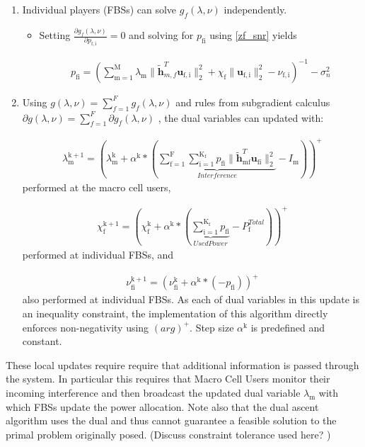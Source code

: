 \documentclass[12pt,a4paper]{report}
\begin{document}
\begin{enumerate}
\item 
Individual players (FBSs) can solve $ g_f(\lambda,\nu) $ independently.
\begin{itemize}
\item Setting $\frac{\partial g_f(\lambda,\nu)}{\partial p_{\mathrm{f,i}}} = 0$ 
and solving for $p_{\mathrm{fi}}$ using \eqref{zf_snr} yields

\begin{gather}
p_{\mathrm{fi}} = (\sum_{\mathrm{m=1}}^{\mathrm{M}}\lambda_{\mathrm{m}}\|\mathbf{\tilde{h}}_{m,f}^T \mathbf{u}_{\mathrm{f,i}}\|^2_2
+\chi_{\text{f}} \|\mathbf{u}_{\mathrm{f,i}}\|^2_2
-\nu_{\mathrm{f,i}}
 )^{-1}
  - \sigma^2_n
\end{gather}

\end{itemize}
\item 
Using $g(\lambda,\nu) = \sum_{f=1}^{F}g_f(\lambda,\nu)$ and rules from subgradient calculus 
$\partial g(\lambda,\nu) = \sum_{f=1}^{F} \partial g_f(\lambda,\nu)$ 
, the dual variables can updated with:

\begin{gather}
\lambda_{\mathrm{m}}^{\mathrm{k+1}} = (
\lambda_{\mathrm{m}}^{\mathrm{k}}
+
\alpha^{\mathrm{k}}*
(
\underbrace{
\sum _{\mathrm{f=1}}^{\mathrm{F}}
\sum _{\mathrm{i=1}}^{\mathrm{K_{\mathrm{f}}}}
p_{\mathrm{fi}}
\|\mathbf{\tilde{h}}_{\mathrm{mf}}^T \mathbf{u_{\mathrm{fi}}}\|^2_2}_{Interference}
- I_{\mathrm{m}}
))^+
\end{gather}
performed at the macro cell users,

\begin{gather}
\chi_{\mathrm{f}}^{\mathrm{k+1}} = (
\chi_{\mathrm{f}}^{\mathrm{k}}
+
\alpha^{\mathrm{k}}*
(\underbrace{\sum_{\mathrm{i=1}}^{\mathrm{K_{\mathrm{f}}}} p_{\mathrm{fi}}}_{Used Power} - P_{\mathrm{f}}^{Total}) )^+
\end{gather}
performed at individual FBSs, and 

\begin{gather}
\nu_{\mathrm{fi}}^{\mathrm{k+1}} = (
\nu_{\mathrm{fi}}^{\mathrm{k}}
+
\alpha^{\mathrm{k}}*
(-p_{\mathrm{fi}}))^+
\end{gather}
also performed at individual FBSs.
As each of dual variables in this update is an inequality constraint, the implementation of this algorithm directly enforces non-negativity using 
$(arg)^+$.
Step size $\alpha^{\mathrm{k}}$ is predefined and constant.



\end{enumerate} 
These local updates require require that additional information is passed through the system. In particular this requires that Macro Cell Users monitor their incoming interference and then broadcast the updated dual variable $\lambda_{\text{m}}$ with which FBSs update the power allocation. 
Note also that the dual ascent algorithm uses the dual and thus cannot guarantee a feasible solution to the primal problem originally posed. (Discuss constraint tolerance used here? )
\end{document}
